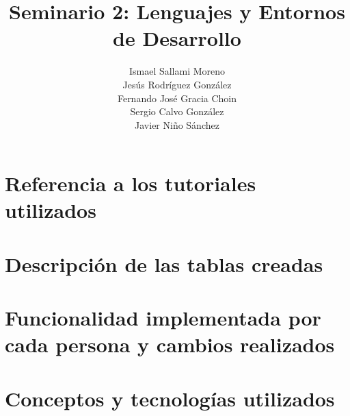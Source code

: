 \documentclass[twoside,openright,titlepage,numbers=noenddot,headinclude,footinclude=true,
cleardoublepage=empty,abstractoff,BCOR=5mm,paper=a4,fontsize=12pt,main=spanish,pdfstartpage=1]{scrreprt}
\author{Ismael Sallami Moreno \\ Jesús Rodríguez González \\ Fernando José Gracia Choin \\ Sergio Calvo González \\ Javier Niño Sánchez}
\title{Seminario 2: Lenguajes y Entornos de Desarrollo}
\theoremstyle{plain}
\begin{document}
\maketitle

\onehalfspacing

\tableofcontents
\newpage

% 

\chapter{Referencia a los tutoriales utilizados}


\chapter{Descripción de las tablas creadas}


\chapter{Funcionalidad implementada por cada persona y cambios realizados}


\chapter{Conceptos y tecnologías utilizados}














%

\end{document}
